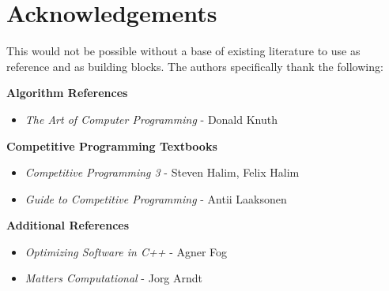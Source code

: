 \section*{Acknowledgements}

This would not be possible without a base of existing literature to use as reference and as building blocks. The authors specifically thank the following:

\textbf{Algorithm References}
\begin{itemize}
\item \textit{The Art of Computer Programming} - Donald Knuth
\end{itemize}

\textbf{Competitive Programming Textbooks}
\begin{itemize}
\item \textit{Competitive Programming 3} - Steven Halim, Felix Halim
\item \textit{Guide to Competitive Programming} - Antii Laaksonen
\end{itemize}

\textbf{Additional References}
\begin{itemize}
\item \textit{Optimizing Software in C++} - Agner Fog
\item \textit{Matters Computational} - Jorg Arndt
\end{itemize}